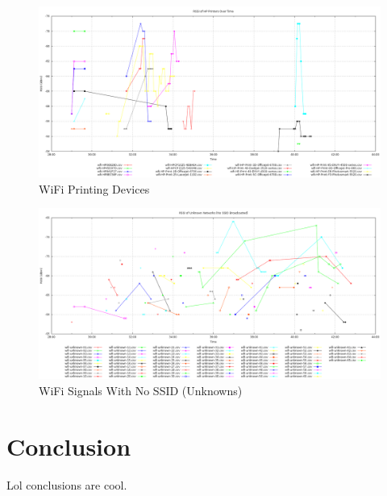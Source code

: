 \documentclass[journal,twocolumn]{IEEEtran}
\begin{document}
\begin{figure}
\begin{center}
\includegraphics[scale=0.3]{wifi-data/005-printers.png}
\caption{WiFi Printing Devices}
\label{fig_wifi_5}
\end{center}
\end{figure}

\begin{figure}
\begin{center}
\includegraphics[scale=0.3]{wifi-data/006-unknowns.png}
\caption{WiFi Signals With No SSID (Unknowns)}
\label{fig_wifi_6}
\end{center}
\end{figure}

\section{Conclusion}

Lol conclusions are cool.



%

%
\end{document}
